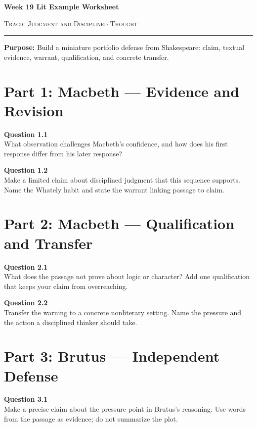 \documentclass[12pt]{article}
\begin{document}
\begin{center}
{\LARGE\bfseries Week 19 Lit Example Worksheet}\par\vspace{0.05em}
{\large\scshape Tragic Judgment and Disciplined Thought}\par\vspace{0.12em}
\rule{0.78\textwidth}{0.5pt}
\end{center}
\textbf{Purpose:} Build a miniature portfolio defense from Shakespeare: claim, textual evidence, warrant, qualification, and concrete transfer.

\section*{Part 1: Macbeth --- Evidence and Revision}
\textbf{Question 1.1}\\[-0.15em]
What observation challenges Macbeth's confidence, and how does his first response differ from his later response?

\textbf{Question 1.2}\\[-0.15em]
Make a limited claim about disciplined judgment that this sequence supports. Name the Whately habit and state the warrant linking passage to claim.

\newpage
\section*{Part 2: Macbeth --- Qualification and Transfer}
\textbf{Question 2.1}\\[-0.15em]
What does the passage not prove about logic or character? Add one qualification that keeps your claim from overreaching.

\textbf{Question 2.2}\\[-0.15em]
Transfer the warning to a concrete nonliterary setting. Name the pressure and the action a disciplined thinker should take.

\newpage
\section*{Part 3: Brutus --- Independent Defense}
\textbf{Question 3.1}\\[-0.15em]
Make a precise claim about the pressure point in Brutus's reasoning. Use words from the passage as evidence; do not summarize the plot.
\end{document}
